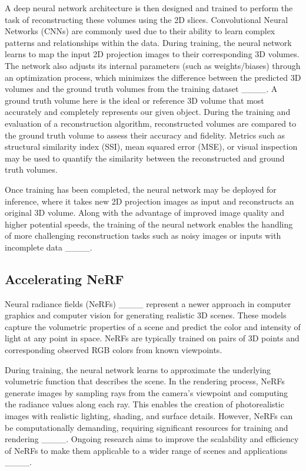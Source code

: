 A deep neural network architecture is then designed and trained to perform the task of reconstructing these volumes using the 2D slices. Convolutional Neural Networks (CNNs) are commonly used due to their ability to learn complex patterns and relationships within the data. During training, the neural network learns to map the input 2D projection images to their corresponding 3D volumes. The network also adjusts its internal parameters (such as weights/biases) through an optimization process, which minimizes the difference between the predicted 3D volumes and the ground truth volumes from the training dataset ____. A ground truth volume here is the ideal or reference 3D volume that most accurately and completely represents our given object. During the training and evaluation of a reconstruction algorithm, reconstructed volumes are compared to the ground truth volume to assess their accuracy and fidelity. Metrics such as structural similarity index (SSI), mean squared error (MSE), or visual inspection may be used to quantify the similarity between the reconstructed and ground truth volumes.

Once training has been completed, the neural network may be deployed for inference, where it takes new 2D projection images as input and reconstructs an original 3D volume. Along with the advantage of improved image quality and higher potential speeds, the training of the neural network enables the handling of more challenging reconstruction tasks such as noisy images or inputs with incomplete data ____.

\subsection{Accelerating NeRF}

Neural radiance fields (NeRFs) ____ represent a newer approach in computer graphics and computer vision for generating realistic 3D scenes. These models capture the volumetric properties of a scene and predict the color and intensity of light at any point in space. NeRFs are typically trained on pairs of 3D points and corresponding observed RGB colors from known viewpoints. 

During training, the neural network learns to approximate the underlying volumetric function that describes the scene. In the rendering process, NeRFs generate images by sampling rays from the camera's viewpoint and computing the radiance values along each ray. This enables the creation of photorealistic images with realistic lighting, shading, and surface details. However, NeRFs can be computationally demanding, requiring significant resources for training and rendering ____. Ongoing research aims to improve the scalability and efficiency of NeRFs to make them applicable to a wider range of scenes and applications ____.

